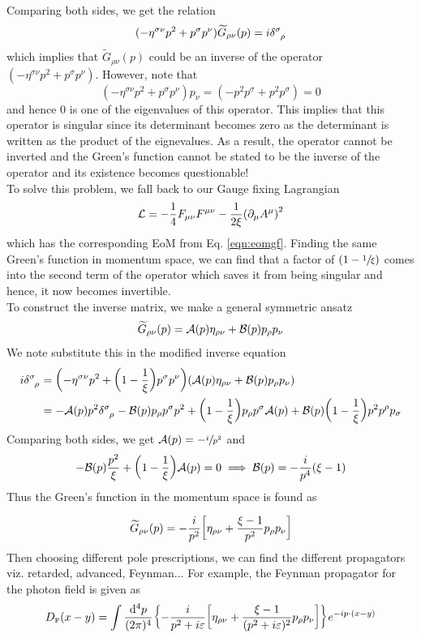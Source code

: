 Comparing both sides, we get the relation 
$$(-\eta^{\sigma\nu} p^2 + p^\sigma p^\nu) \widetilde{G}_{\rho\nu}(p) = i\delt{\sigma}{\rho} $$
which implies that $\widetilde{G}_{\rho\nu}(p)$ could be an inverse of the operator $(-\eta^{\sigma\nu} p^2 + p^\sigma p^\nu)$. However, note that 
$$(-\eta^{\sigma\nu} p^2 + p^\sigma p^\nu)p_\nu = (-p^2 p^\sigma + p^2 p^\sigma) = 0 $$ 
and hence $0$ is one of the eigenvalues of this operator. This implies that this operator is  singular since its determinant becomes zero as the determinant is written as the product of the eignevalues. As a result, the operator cannot be inverted and the Green's function cannot be stated to be the inverse of the operator and its existence becomes questionable! \\[0.2cm]
To solve this problem, we fall back to our Gauge fixing Lagrangian 
$$\mathcal L = -\frac{1}{4}F_{\mu\nu} F^{\mu\nu} - \frac{1}{2\xi}\qty(\partial_\mu A^\mu)^2$$
which has the corresponding EoM from Eq. \ref{eqn:eomgf}. Finding the same Green's function in momentum space, we can find that a factor of $\qty(1-\sfrac{1}{\xi})$ comes into the second term of the operator which saves it from being singular and hence, it now becomes invertible. \\[0.2cm]
To construct the inverse matrix, we make a general symmetric ansatz
$$\widetilde{G}_{\rho\nu}(p) = \mathcal A(p) \eta_{\rho\nu} + \mathcal B(p)p_\rho p_\nu$$
We note substitute this in the modified inverse equation 
\begin{align*}
     i\delt{\sigma}{\rho} &=\qty(-\eta^{\sigma\nu} p^2 +\qty(1-\frac{1}{\xi}) p^\sigma p^\nu)\qty( \SA(p) \eta_{\rho\nu} + \SB(p)p_\rho p_\nu)\\
     &=-\SA(p)p^2\delt{\sigma}{\rho} -\SB(p)p_\rho p^\sigma p^2 + \qty(1-\frac{1}{\xi})p_\rho p^\sigma \SA(p) + \SB(p)\qty(1-\frac{1}{\xi}) p^2 p^\rho p_\sigma
\end{align*}
Comparing both sides, we get $\mathcal A(p) = -\sfrac{i}{p^2}$ and 
$$-\mathcal B(p)\frac{p^2}{\xi}+\qty(1-\frac{1}{\xi}) \mathcal A(p)=0 \implies \mathcal B(p) = -\frac{i}{p^4}(\xi-1)$$
Thus the Green's function in the momentum space is found as 

$$\widetilde{G}_{\rho\nu}(p) = -\frac{i}{p^2}\qty[\eta_{\rho\nu} + \frac{\xi-1}{p^2}p_\rho p_\nu]$$
Then choosing different pole prescriptions, we can find the different propagators viz. retarded, advanced, Feynman... For example, the Feynman propagator for the photon field is given as 
$$D_{\text{\tiny F}}(x-y) = \int \frac{\dd^4 p}{(2\pi)^4}  \qty{ -\frac{i}{p^2+i\varepsilon}\qty[\eta_{\rho\nu} + \frac{\xi-1}{(p^2+i\varepsilon)^2}p_\rho p_\nu]}   e^{-ip\cdot (x-y)}  $$